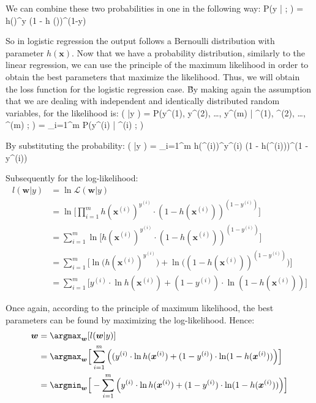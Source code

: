 We can combine these two probabilities in one in the following way:
\bse
P(y | ; ) = h()^y \cdot (1 - h ())^{(1-y)}
\ese

So in logistic regression the output follows a Bernoulli distribution with parameter $h(\boldsymbol{x})$. Now that we
have a probability distribution, similarly to the linear regression, we can use the principle of the maximum
likelihood in order to obtain the best parameters that maximize the likelihood. Thus, we will obtain the loss
function for the logistic regression case. \v

By making again the assumption that we are dealing with independent and identically distributed random variables, for
the likelihood is:
\bse
{} ( |y ) = P(y^{(1)}, y^{(2)}, \ldots, y^{(m)} | ^{(1)}, ^{(2)},
\ldots, ^{(m)} ; ) = \prod_{i=1}^{m} P(y^{(i)} | ^{(i)} ; )
\ese

By substituting the probability:
\bse
{} ( |y )
= \prod_{i=1}^{m} h(^{(i)})^{y^{(i)}} \cdot (1 - h(^{(i)}))^{(1 - {y^{(i)}})}
\ese

Subsequently for the log-likelihood:
{\setlength{\jot}{10pt}
\begin{align*}
l (\boldsymbol{w} |y ) &= \ln \mathcal{L} (\boldsymbol{w} |y ) \\
&= \ln \Big[ \prod_{i=1}^{m} h(\boldsymbol{x}^{(i)})^{y^{(i)}}
\cdot (1 - h(\boldsymbol{x}^{(i)}))^{(1 - {y^{(i)}})} \Big] \\
&= \sum_{i=1}^{m} \ln \Big[ h(\boldsymbol{x}^{(i)})^{y^{(i)}}
\cdot (1 - h(\boldsymbol{x}^{(i)}))^{(1 - {y^{(i)}})} \Big] \\
&= \sum_{i=1}^{m} \Big[ \ln \Big( h(\boldsymbol{x}^{(i)})^{y^{(i)}}\Big)
+ \ln \Big( (1 - h(\boldsymbol{x}^{(i)}))^{(1 - {y^{(i)}})} \Big) \Big] \\
&= \sum_{i=1}^{m} \Big[ y^{(i)} \cdot \ln h(\boldsymbol{x}^{(i)})
+ (1 - {y^{(i)}}) \cdot \ln (1 - h (\boldsymbol{x}^{(i)})) \Big]
\end{align*}}

Once again, according to the principle of maximum likelihood, the best parameters can be found by maximizing the
log-likelihood. Hence:
{\setlength{\jot}{10pt}
\begin{align*}
\boldsymbol{w} &= \argmax_{\boldsymbol{w}} [l (\boldsymbol{w} |y )] \\
&= \argmax_{\boldsymbol{w}} \Big[ \sum_{i=1}^{m} \Big( (y^{(i)}
\cdot \ln h(\boldsymbol{x}^{(i)}) + (1 - {y^{(i)}}) \cdot \ln (1 - h(\boldsymbol{x}^{(i)})) \Big) \Big] \\
&= \argmin_{\boldsymbol{w}} \Big[ - \sum_{i=1}^{m} \Big( y^{(i)}
\cdot \ln h(\boldsymbol{x}^{(i)}) + (1 - {y^{(i)}}) \cdot \ln (1 - h(\boldsymbol{x}^{(i)})) \Big) \Big]
\end{align*}}


